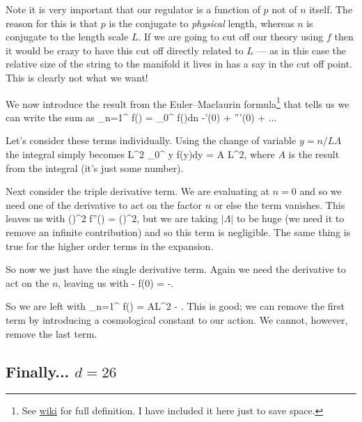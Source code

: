\br 
Note it is very important that our regulator is a function of $p$ not of $n$ itself. The reason for this is that $p$ is the conjugate to \textit{physical} length, whereas $n$ is conjugate to the length scale $L$. If we are going to cut off our theory using $f$ then it would be crazy to have this cut off directly related to $L$ --- as in this case the relative size of the string to the manifold it lives in has a say in the cut off point. This is clearly not what we want!
\er 

We now introduce the result from the Euler–Maclaurin formula\footnote{See \href{https://en.wikipedia.org/wiki/Euler–Maclaurin_formula}{wiki} for full definition. I have included it here just to save space.} that tells us we can write the sum as
\bse 
    \sum_{n=1}^{\infty} f\bigg(\bigg) = \int_0^{\infty} f\bigg(\bigg)dn -'(0) +   '''(0) + ... 
\ese 

Let's consider these terms individually. Using the change of variable $y=n/L\Lambda$ the integral simply becomes 
\bse 
    L\Lambda^2 \int_0^{\infty} y f(y)dy = A L\Lambda^2,
\ese 
where $A$ is the result from the integral (it's just some number). 

Next consider the triple derivative term. We are evaluating at $n=0$ and so we need one of the derivative to act on the factor $n$ or else the term vanishes. This leaves us with 
\bse 
      \bigg(\bigg)^2 f''\bigg(\bigg) =   \bigg(\bigg)^2,
\ese 
but we are taking $|\Lambda|$ to be huge (we need it to remove an infinite contribution) and so this term is negligible. The same thing is true for the higher order terms in the expansion.

So now we just have the single derivative term. Again we need the derivative to act on the $n$, leaving us with 
\bse 
    -  f(0) = -.
\ese 

So we are left with 
\bse 
    \sum_{n=1}^{\infty} f\bigg(\bigg) = AL\Lambda^2 - .
\ese 
This is good; we can remove the first term by introducing a cosmological constant to our action. We cannot, however, remove the last term. 

\subsection{Finally... $d=26$}

